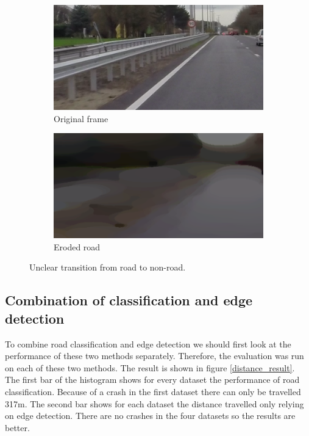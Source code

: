 \documentclass[runningheads,a4paper]{llncs}
\begin{document}
\begin{figure}[ht]
\centering
\begin{subfigure}{.5\textwidth}
  \centering
  \includegraphics[width=.9\textwidth]{fig/transition_road_dirt_original.png}
  \caption{Original frame\label{transition_road_dirt_original}}
\end{subfigure}%
\begin{subfigure}{.5\textwidth}
  \centering
  \includegraphics[width=.9\textwidth]{fig/transition_road_dirt_eroded.png}
  \caption{Eroded road\label{transition_road_dirt_eroded}}
\end{subfigure}
\caption{Unclear transition from road to non-road.}
\end{figure}


\subsection{Combination of classification and edge detection}

To combine road classification and edge detection we should first look at the performance of these two methods separately. Therefore, the evaluation was run on each of these two methods. The result is shown in figure \ref{distance_result}. The first bar of the histogram shows for every dataset the performance of road classification. Because of a crash in the first dataset there can only be travelled 317m. The second bar shows for each dataset the distance travelled only relying on edge detection. There are no crashes in the four datasets so the results are better. 
\end{document}
